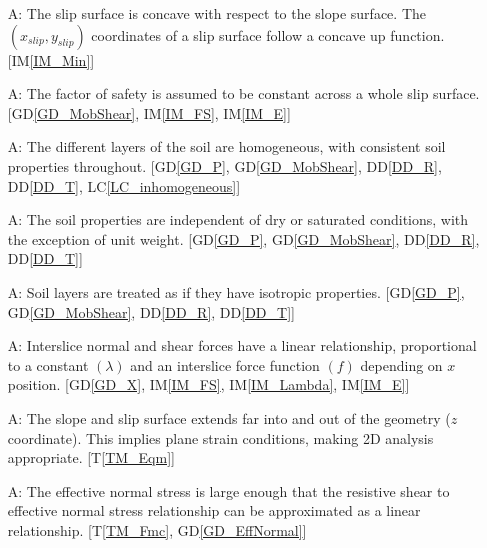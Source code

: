 \documentclass[12pt]{article}
\newcounter{assumpnum} %
\newcommand{\tref}[1]{T\ref{#1}}
\newcommand{\iref}[1]{IM\ref{#1}}
\newcommand{\ddref}[1]{DD\ref{#1}}
\newcommand{\dref}[1]{GD\ref{#1}}
\newcommand{\lcref}[1]{LC\ref{#1}}
\begin{document}
\begin{enumerate}[label=A\arabic*:,ref={\arabic*}]
\item [A\refstepcounter{assumpnum}\theassumpnum: \label{A_Concave}] The
  slip surface is concave with respect to the slope surface. The 
  $(x_{slip},y_{slip})$ coordinates of a slip surface follow a concave up 
  function. [\iref{IM_Min}]

\item [A\refstepcounter{assumpnum}\theassumpnum: \label{A_Constant}] The factor 
of safety is assumed to be constant across a whole slip surface. 
[\dref{GD_MobShear}, \iref{IM_FS}, \iref{IM_E}]

\item [A\refstepcounter{assumpnum}\theassumpnum: \label{A_Homo}] The
  different layers of the soil are homogeneous, with consistent soil
  properties throughout. [\dref{GD_P}, \dref{GD_MobShear}, \ddref{DD_R}, 
  \ddref{DD_T}, \lcref{LC_inhomogeneous}]
  
\item [A\refstepcounter{assumpnum}\theassumpnum: \label{A_Saturated}] The soil 
properties are independent of dry or saturated conditions, with the exception 
of unit weight. [\dref{GD_P}, \dref{GD_MobShear}, \ddref{DD_R}, 
\ddref{DD_T}]

\item [A\refstepcounter{assumpnum}\theassumpnum: \label{A_Isotropic}]
  Soil layers are treated as if they have isotropic properties. [\dref{GD_P}, 
  \dref{GD_MobShear}, \ddref{DD_R}, \ddref{DD_T}]
  
\item [A\refstepcounter{assumpnum}\theassumpnum: \label{A_Base}]
  Interslice normal and shear forces have a linear relationship,
  proportional to a constant $\left({\lambda}\right)$ and an
  interslice force function $\left({f}\right)$ depending on $x$
  position. [\dref{GD_X}, \iref{IM_FS}, \iref{IM_Lambda}, \iref{IM_E}]
  
\item [A\refstepcounter{assumpnum}\theassumpnum: \label{A_2D}] The
  slope and slip surface extends far into and out of the geometry ($z$
  coordinate). This implies plane strain conditions, making 2D
  analysis appropriate. [\tref{TM_Eqm}]

\item [A\refstepcounter{assumpnum}\theassumpnum: \label{A_Lin}] The
  effective normal stress is large enough that the resistive shear to
  effective normal stress relationship can be approximated as a linear
  relationship. [\tref{TM_Fmc}, \dref{GD_EffNormal}]


\end{enumerate}
\end{document}
